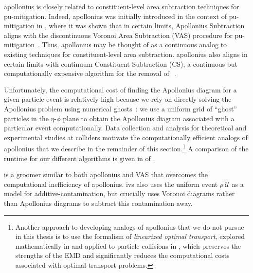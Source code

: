 \gls{apollonius} is closely related to constituent-level area subtraction techniques for \gls{pu-mitigation}.
%
Indeed, \gls{apollonius} was initially introduced in the context of \gls{pu-mitigation} in , where it was shown that in certain limits, Apollonius Subtraction aligns with the discontinuous Voronoi Area Subtraction (VAS) procedure for \gls{pu-mitigation}~\cite{Cacciari:2007fd, Cacciari:2008gn, Cacciari:2011ma}.
%
Thus, \gls{apollonius} may be thought of as a continuous analog to existing techniques for constituent-level area subtraction.
%
\gls{apollonius} also aligns in certain limits with continuum Constituent Subtraction (CS), a continuous but computationally expensive algorithm for the removal of ~\cite{Berta:2014eza, Komiske:2020qhg}.

Unfortunately, the computational cost of finding the Apollonius diagram for a given particle event is relatively high because we rely on directly solving the Apollonius problem using numerical ghosts~\cite{Komiske:2020qhg}:
%
we use a uniform grid of ``ghost'' particles in the \(\eta\)-\(\phi\) plane to obtain the Apollonius diagram associated with a particular event computationally.
%
Data collection and analysis for theoretical and experimental studies at colliders motivate the computationally efficient analogs of \gls{apollonius} that we describe in the remainder of this section.\footnote{Another approach to developing analogs of \gls{apollonius} that we do not pursue in this thesis is to use the formalism of \textit{linearized optimal transport}, explored mathematically in  and applied to particle collisions in , which preserves the strengths of the EMD and significantly reduces the computational costs associated with optimal transport problems.}
%
A comparison of the runtime for our different \PIRANHA{} algorithms is given in  of .



 is a \PIRANHA{} groomer similar to both \gls{apollonius} and VAS that overcomes the computational inefficiency of \gls{apollonius}.
%
\gls{ivs} also uses the uniform event \(\rho\,\mathcal U\) as a model for \gls{additive-contamination}, but crucially uses Voronoi diagrams rather than Apollonius diagrams to subtract this contamination away.

